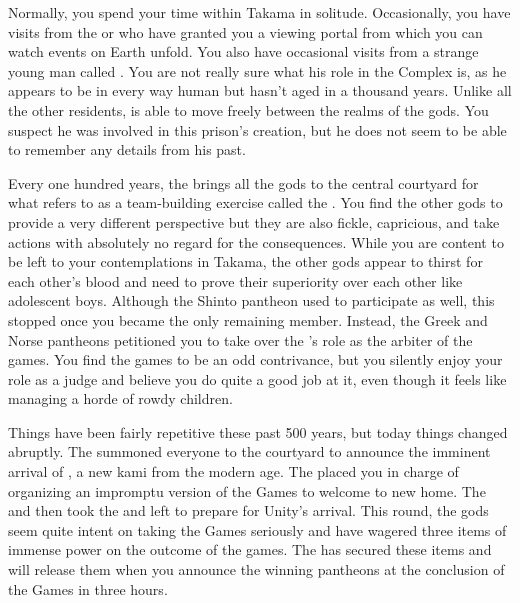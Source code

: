 \documentclass[char]{guardians}
\begin{document}
Normally, you spend your time within Takama in solitude. Occasionally, you have visits from the \cCaretaker{} or \cWarden{} who have granted you a viewing portal from which you can watch events on Earth unfold. You also have occasional visits from a strange young man called \cJascha{\intro}. You are not really sure what his role in the Complex is, as he appears to be in every way human but hasn't aged in a thousand years. Unlike all the other residents, \cJascha{} is able to move freely between the realms of the gods. You suspect he was involved in this prison's creation, but he does not seem to be able to remember any details from his past.

Every one hundred years, the \cCaretaker{} brings all the gods to the central courtyard for what \cCaretaker{\they} refers to as a team-building exercise called the \pGames{}. You find the other gods to provide a very different perspective but they are also fickle, capricious, and take actions with absolutely no regard for the consequences. While you are content to be left to your contemplations in Takama, the other gods appear to thirst for each other's blood and need to prove their superiority over each other like adolescent boys. Although the Shinto pantheon used to participate as well, this stopped once you became the only remaining member. Instead, the Greek and Norse pantheons petitioned you to take over the \cCaretaker{}'s role as the arbiter of the games. You find the games to be an odd contrivance, but you silently enjoy your role as a judge and believe you do quite a good job at it, even though it feels like managing a horde of rowdy children.

Things have been fairly repetitive these past 500 years, but today things changed abruptly. The \cCaretaker{} summoned everyone to the courtyard to announce the imminent arrival of \cUnity{}, a new kami from the modern age. The \cCaretaker{} placed you in charge of organizing an impromptu version of the Games to welcome \cUnity{} to \cUnity{\their} new home. The \cCaretaker{} and \cWarden{} then took the \stone{} and left to prepare for Unity's arrival. This round, the gods seem quite intent on taking the Games seriously and have wagered three items of immense power on the outcome of the games. The \cCaretaker{} has secured these items and will release them when you announce the winning pantheons at the conclusion of the Games in three hours.

\end{document}
